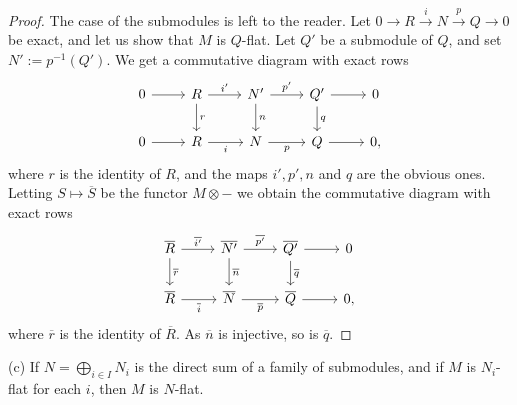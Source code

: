 \documentclass[12pt,letterpaper]{article}%
\newcommand{\nn}{\noindent}
\begin{document}
\begin{proof} 
The case of the submodules is left to the reader. Let $0\to R\xrightarrow iN\xrightarrow pQ\to0$ be exact, and let us show that $M$ is $Q$-flat. Let $Q'$ be a submodule of $Q$, and set $N':=p^{-1}(Q')$. We get a commutative diagram with exact rows
$$
\begin{tikzcd}
0\ar[r]&R\ar[d,"r"]\ar[r,"i'"]&N'\ar[d,"n"]\ar[r,"p'"]& Q'\ar[d,"q"]\ar[r]&0\\ 
0\ar[r]&R\ar[r,"i"']&N\ar[r,"p"']& Q\ar[r]&0,
\end{tikzcd}
$$ 
where $r$ is the identity of $R$, and the maps $i',p',n$ and $q$ are the obvious ones. Letting $S\mapsto\overline S$ be the functor $M\otimes-$ we obtain the commutative diagram with exact rows
$$
\begin{tikzcd}
\overline R\ar[d,"\overline r"]\ar[r,"\overline{i'}"]&\overline{N'}\ar[d,"\overline n"]\ar[r,"\overline{p'}"]& \overline{Q'}\ar[d,"\overline q"]\ar[r]&0\\ 
\overline R\ar[r,"\overline i"']&\overline N\ar[r,"\overline p"']& \overline Q\ar[r]&0,
\end{tikzcd}
$$ 
where $\overline r$ is the identity of $\overline R$. As $\overline n$ is injective, so is $\overline q$. 
\end{proof}

\nn(c) If $N=\bigoplus_{i\in I}N_i$ is the direct sum of a family of submodules, and if $M$ is $N_i$-flat for each $i$, then $M$ is $N$-flat. 
\end{document}
